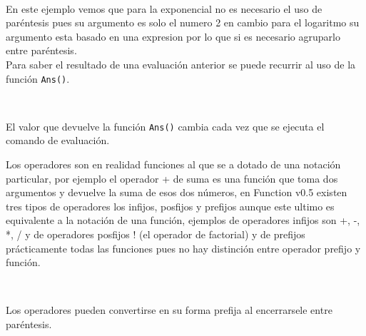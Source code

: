       \begin{fxcode}
         \\
      \end{fxcode}
      
      En este ejemplo vemos que para la exponencial no es necesario el uso de paréntesis pues su argumento es solo el numero 2 en cambio para el logaritmo su argumento esta basado en una expresion por lo que si es necesario agruparlo entre paréntesis.
      \\
      
      Para saber el resultado de una evaluación anterior se puede recurrir al uso de la función \texttt{Ans()}.
      
      \begin{fxcode}
         \\
          
      \end{fxcode}
      
      El valor que devuelve la función \texttt{Ans()} cambia cada vez que se ejecuta el comando de evaluación.
      
      Los operadores son en realidad funciones al que se a dotado de una notación particular, por ejemplo el operador + de suma es una función que toma dos argumentos y devuelve la suma de esos dos números, en Function v0.5 existen tres tipos de operadores los infijos, posfijos y prefijos aunque este ultimo es equivalente a la notación de una función, ejemplos de operadores infijos son +, -, *, / y de operadores posfijos ! (el operador de factorial) y de prefijos prácticamente todas las funciones pues no hay distinción entre operador prefijo y función.
      
      \begin{fxcode}
           \\
      \end{fxcode}
      
      Los operadores pueden convertirse en su forma prefija al encerrarsele entre paréntesis.
      
      \begin{fxcode}
         \\
      \end{fxcode}
      
